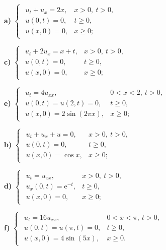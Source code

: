 \documentclass[10pt, a4paper]{article}
\begin{document}
	\begin{multicols}{2}
		\begin{flushleft}
			\textbf{a) }$\begin{cases}
				\begin{array}{ll}
					u_t+u_x=2x, & x>0,~t>0, \\
					u(0,t)=0, & t\ge0,\\
					u(x,0)=0, & x\ge0;
				\end{array}
			\end{cases}$
		\end{flushleft}
		\begin{flushleft}
			\textbf{c) }$\begin{cases}
				\begin{array}{ll}
					u_t+2u_x=x+t, & x>0,~t>0, \\
					u(0,t)=0, & t\ge0,\\
					u(x,0)=0, & x\ge0;
				\end{array}
			\end{cases}$
		\end{flushleft}
		\begin{flushleft}
			\textbf{e) }$\begin{cases}
				\begin{array}{ll}
					u_t=4u_{xx}, & 0<x<2,~t>0, \\
					u(0,t)=u(2,t)=0, & t\ge0,\\
					u(x,0)=2\sin(2\pi x), & x\ge0;
				\end{array}
			\end{cases}$
		\end{flushleft}
		\columnbreak
		\begin{flushleft}
			\textbf{b) }$\begin{cases}
				\begin{array}{ll}
					u_t+u_x+u=0, & x>0,~t>0, \\
					u(0,t)=0, & t\ge0,\\
					u(x,0)=\cos x, & x\ge0;
				\end{array}
			\end{cases}$
		\end{flushleft}
		\begin{flushleft}
			\textbf{d) }$\begin{cases}
				\begin{array}{ll}
					u_t=u_{xx}, & x>0,~t>0, \\
					u_x(0,t)=\mathrm e^{-t}, & t\ge0,\\
					u(x,0)=0, & x\ge0;
				\end{array}
			\end{cases}$
		\end{flushleft}
		\begin{flushleft}
			\textbf{f) }$\begin{cases}
				\begin{array}{ll}
					u_t=16u_{xx}, & 0<x<\pi,~t>0, \\
					u(0,t)=u(\pi,t)=0, & t\ge0,\\
					u(x,0)=4\sin(5x), & x\ge0.
				\end{array}
			\end{cases}$
		\end{flushleft}
	\end{multicols}
\end{document}
